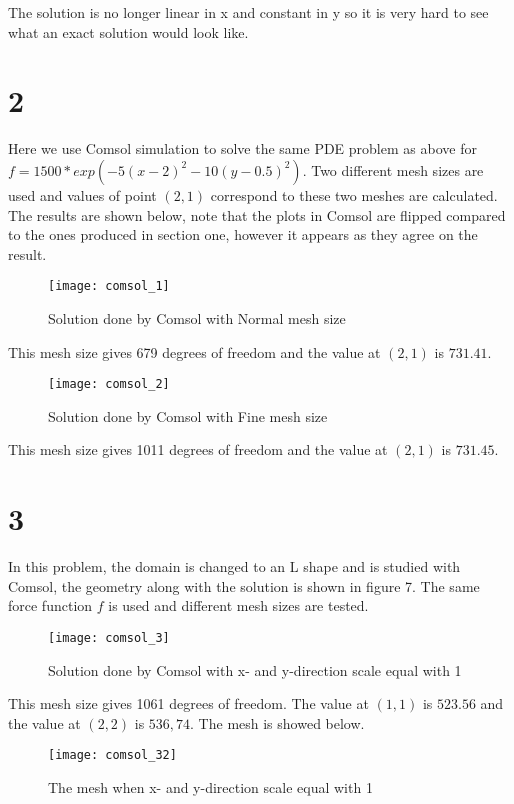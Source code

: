 \documentclass[11pt,a4paper,roman]{scrartcl}
\begin{document}
The solution is no longer linear in x and constant in y so it is very hard to see what an exact solution would look like.

\section*{2}
Here we use Comsol simulation to solve the same PDE problem as above for $f=1500*exp(-5(x-2)^2-10(y-0.5)^2)$. 
Two different mesh sizes are used and values of point $(2,1)$ correspond to these two meshes are calculated. 
The results are shown below, note that the plots in Comsol are flipped compared to the ones produced in section one, however it appears as they agree on the result. 

\begin{figure}[!h]
\centering
\texttt{[image: comsol\_1]}
\caption{Solution done by Comsol with Normal mesh size}
\end{figure}
This mesh size gives 679 degrees of freedom and the value at $(2,1)$ is $731.41$. 

\begin{figure}[H]
\centering
\texttt{[image: comsol\_2]}
\caption{Solution done by Comsol with Fine mesh size}
\end{figure}
This mesh size gives 1011 degrees of freedom and the value at $(2,1)$ is $731.45$. 

\newpage
\section*{3}
In this problem, the domain is changed to an L shape and is studied with Comsol, the geometry along with the solution is shown in figure 7. The same force function $f$ is used and different mesh sizes are tested. 

\begin{figure}[H]
\texttt{[image: comsol\_3]}
\caption{Solution done by Comsol with x- and y-direction scale equal with 1}
\end{figure}
This mesh size gives 1061 degrees of freedom. The value at $(1,1)$ is $523.56$ and the value at $(2,2)$ is $536,74$. The mesh is showed below. 

\begin{figure}[H]
\texttt{[image: comsol\_32]}
\caption{The mesh when x- and y-direction scale equal with 1}
\end{figure}
\end{document}
